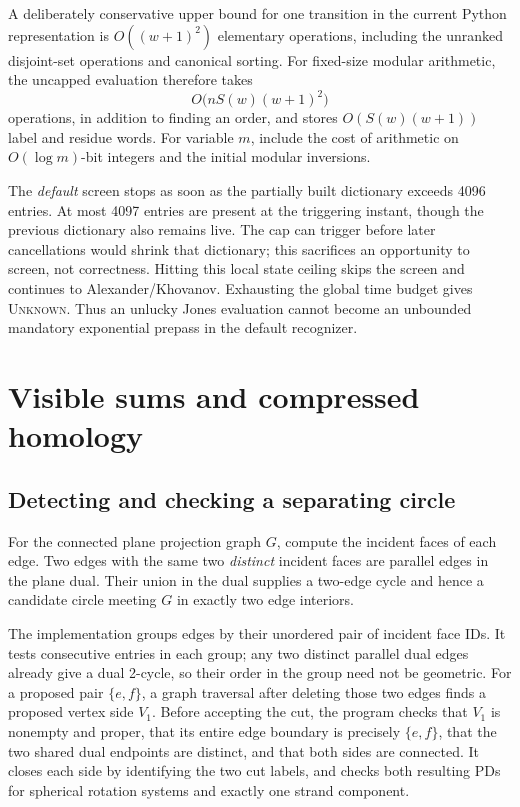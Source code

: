\documentclass[11pt,a4paper]{article}
\theoremstyle{definition}\newtheorem{remark}[theorem]{Remark}
\newcommand{\Unknown}{\textsc{Unknown}}
\begin{document}
A deliberately conservative upper bound for one transition in the current
Python representation is $O((w+1)^2)$ elementary operations, including the
unranked disjoint-set operations and canonical sorting. For fixed-size modular
arithmetic, the uncapped evaluation therefore takes
\[
O\bigl(nS(w)(w+1)^2\bigr)
\]
operations, in addition to finding an order, and stores $O(S(w)(w+1))$ label and
residue words. For variable $m$, include the cost of arithmetic on $O(\log m)$-bit
integers and the initial modular inversions.

The \emph{default} screen stops as soon as the partially built dictionary exceeds
4096 entries. At most 4097 entries are present at the triggering instant, though
the previous dictionary also remains live. The cap can trigger before later
cancellations would shrink that dictionary; this sacrifices an opportunity to
screen, not correctness. Hitting this local state ceiling skips the screen and
continues to Alexander/Khovanov. Exhausting the global time budget gives
\Unknown. Thus an unlucky Jones evaluation cannot become an unbounded mandatory
exponential prepass in the default recognizer.

\section{Visible sums and compressed homology}
\label{sec:factor}
\subsection{Detecting and checking a separating circle}
For the connected plane projection graph $G$, compute the incident faces of
each edge. Two edges with the same two \emph{distinct} incident faces are
parallel edges in the plane dual. Their union in the dual supplies a two-edge
cycle and hence a candidate circle meeting $G$ in exactly two edge interiors.

The implementation groups edges by their unordered pair of incident face IDs.
It tests consecutive entries in each group; any two distinct parallel dual edges
already give a dual 2-cycle, so their order in the group need not be geometric.
For a proposed pair $\{e,f\}$, a graph traversal after deleting those two edges
finds a proposed vertex side $V_1$. Before accepting the cut, the program checks
that $V_1$ is nonempty and proper, that its entire edge boundary is precisely
$\{e,f\}$, that the two shared dual endpoints are distinct, and that both sides
are connected. It closes each side by identifying the two cut labels, and checks
both resulting PDs for spherical rotation systems and exactly one strand component.
\end{document}
